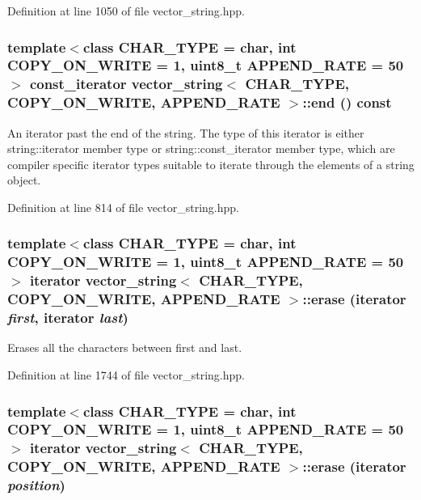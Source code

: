 Definition at line 1050 of file vector\_\-string.hpp.\hypertarget{classvector__string_e6d3431c0ea1a2e0152677b56230a4fa}{
\subsubsection[{end}]{\setlength{\rightskip}{0pt plus 5cm}template$<$class CHAR\_\-TYPE  = char, int COPY\_\-ON\_\-WRITE = 1, uint8\_\-t APPEND\_\-RATE = 50$>$ const\_\-iterator {\bf vector\_\-string}$<$ CHAR\_\-TYPE, COPY\_\-ON\_\-WRITE, APPEND\_\-RATE $>$::end () const}}
\label{classvector__string_e6d3431c0ea1a2e0152677b56230a4fa}


An iterator past the end of the string. The type of this iterator is either string::iterator member type or string::const\_\-iterator member type, which are compiler specific iterator types suitable to iterate through the elements of a string object. 

Definition at line 814 of file vector\_\-string.hpp.\hypertarget{classvector__string_c18e5c85d57d5b27357119228d9639c6}{
\subsubsection[{erase}]{\setlength{\rightskip}{0pt plus 5cm}template$<$class CHAR\_\-TYPE  = char, int COPY\_\-ON\_\-WRITE = 1, uint8\_\-t APPEND\_\-RATE = 50$>$ iterator {\bf vector\_\-string}$<$ CHAR\_\-TYPE, COPY\_\-ON\_\-WRITE, APPEND\_\-RATE $>$::erase (iterator {\em first}, \/  iterator {\em last})}}
\label{classvector__string_c18e5c85d57d5b27357119228d9639c6}


Erases all the characters between first and last. 

Definition at line 1744 of file vector\_\-string.hpp.\hypertarget{classvector__string_26b9ec8489b4a06280b098fa272aaeab}{
\subsubsection[{erase}]{\setlength{\rightskip}{0pt plus 5cm}template$<$class CHAR\_\-TYPE  = char, int COPY\_\-ON\_\-WRITE = 1, uint8\_\-t APPEND\_\-RATE = 50$>$ iterator {\bf vector\_\-string}$<$ CHAR\_\-TYPE, COPY\_\-ON\_\-WRITE, APPEND\_\-RATE $>$::erase (iterator {\em position})}}
\label{classvector__string_26b9ec8489b4a06280b098fa272aaeab}


